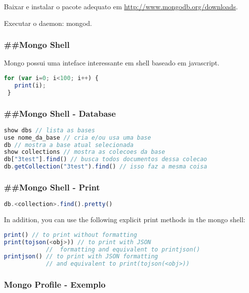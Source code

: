 \documentclass[serif,mathserif]{article}
\begin{document}
Baixar e instalar o pacote adequato em \url{http://www.mongodb.org/downloads}.

Executar o daemon: mongod.

\subsubsection{\#\#Mongo Shell}

Mongo possui uma inteface interessante em shell baseado em javascript.

\begin{lstlisting}[language=Javascript]
 for (var i=0; i<100; i++) {
   print(i);
 }
\end{lstlisting}

\subsubsection{\#\#Mongo Shell - Database}

\begin{lstlisting}[language=Javascript]
show dbs // lista as bases
use nome_da_base // cria e/ou usa uma base
db // mostra a base atual selecionada
show collections // mostra as colecoes da base
db["3test"].find() // busca todos documentos dessa colecao
db.getCollection("3test").find() // isso faz a mesma coisa
\end{lstlisting}

\subsubsection{\#\#Mongo Shell - Print}
\begin{lstlisting}[language=Javascript]
db.<collection>.find().pretty()
\end{lstlisting}

In addition, you can use the following explicit print methods in the mongo shell:
\begin{lstlisting}[language=Javascript]
print() // to print without formatting
print(tojson(<obj>)) // to print with JSON 
            //  formatting and equivalent to printjson()
printjson() // to print with JSON formatting
            // and equivalent to print(tojson(<obj>))
\end{lstlisting}


\subsubsection{Mongo Profile - Exemplo}
\begin{lstlisting}[language=Javascript]

\end{lstlisting}
\end{document}
